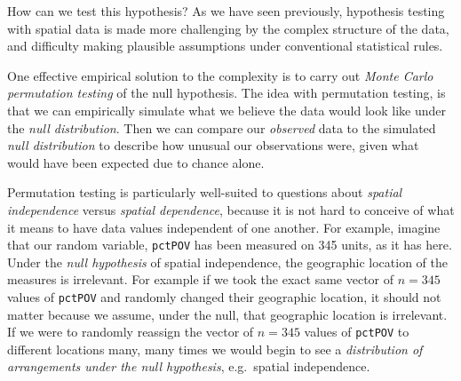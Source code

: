 \documentclass[
]{book}
\begin{document}
How can we test this hypothesis? As we have seen previously, hypothesis testing with spatial data is made more challenging by the complex structure of the data, and difficulty making plausible assumptions under conventional statistical rules.

One effective empirical solution to the complexity is to carry out \emph{Monte Carlo permutation testing} of the null hypothesis. The idea with permutation testing, is that we can empirically simulate what we believe the data would look like under the \emph{null distribution}. Then we can compare our \emph{observed} data to the simulated \emph{null distribution} to describe how unusual our observations were, given what would have been expected due to chance alone.

Permutation testing is particularly well-suited to questions about \emph{spatial independence} versus \emph{spatial dependence}, because it is not hard to conceive of what it means to have data values independent of one another. For example, imagine that our random variable, \texttt{pctPOV} has been measured on 345 units, as it has here. Under the \emph{null hypothesis} of spatial independence, the geographic location of the measures is irrelevant. For example if we took the exact same vector of \(n=345\) values of \texttt{pctPOV} and randomly changed their geographic location, it should not matter because we assume, under the null, that geographic location is irrelevant. If we were to randomly reassign the vector of \(n=345\) values of \texttt{pctPOV} to different locations many, many times we would begin to see a \emph{distribution of arrangements under the null hypothesis}, e.g.~spatial independence.
\end{document}
